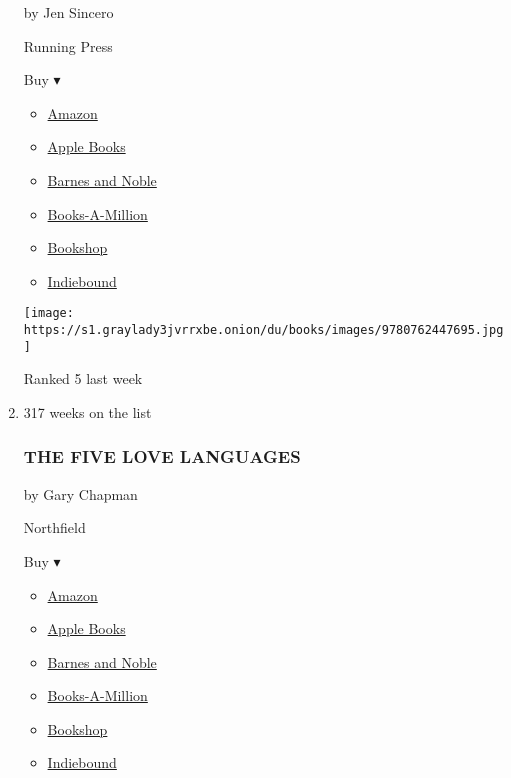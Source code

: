 \begin{enumerate}
  by Jen Sincero

  Running Press

  Buy ▾

  \begin{itemize}
  \tightlist
  \item
    \href{http://www.amazon.com/You-Are-Badass-Doubting-Greatness-ebook/dp/B00B3M3VWS?tag=NYTBS-20}{Amazon}
  \item
    \href{https://du-gae-books-dot-nyt-du-prd.appspot.com/buy?title=YOU+ARE+A+BADASS\&author=Jen+Sincero}{Apple
    Books}
  \item
    \href{https://www.anrdoezrs.net/click-7990613-11819508?url=https\%3A\%2F\%2Fwww.barnesandnoble.com\%2Fw\%2F\%3Fean\%3D9780762447695}{Barnes
    and Noble}
  \item
    \href{https://www.anrdoezrs.net/click-7990613-35140?url=https\%3A\%2F\%2Fwww.booksamillion.com\%2Fp\%2FYOU\%2BARE\%2BA\%2BBADASS\%2FJen\%2BSincero\%2F9780762447695}{Books-A-Million}
  \item
    \href{https://bookshop.org/a/3546/9780762447695}{Bookshop}
  \item
    \href{https://www.indiebound.org/book/9780762447695?aff=NYT}{Indiebound}
  \end{itemize}

  \texttt{[image: https://s1.graylady3jvrrxbe.onion/du/books/images/9780762447695.jpg]}

  Ranked 5 last week
\item
  317 weeks on the list

  \hypertarget{the-five-love-languages}{%
  \subsubsection{THE FIVE LOVE
  LANGUAGES}\label{the-five-love-languages}}

  by Gary Chapman

  Northfield

  Buy ▾

  \begin{itemize}
  \tightlist
  \item
    \href{http://www.amazon.com/The-Love-Languages-Secret-Lasts/dp/0802473156?tag=NYTBS-20}{Amazon}
  \item
    \href{https://du-gae-books-dot-nyt-du-prd.appspot.com/buy?title=THE+FIVE+LOVE+LANGUAGES\&author=Gary+Chapman}{Apple
    Books}
  \item
    \href{https://www.anrdoezrs.net/click-7990613-11819508?url=https\%3A\%2F\%2Fwww.barnesandnoble.com\%2Fw\%2F\%3Fean\%3D9780802412706}{Barnes
    and Noble}
  \item
    \href{https://www.anrdoezrs.net/click-7990613-35140?url=https\%3A\%2F\%2Fwww.booksamillion.com\%2Fp\%2FTHE\%2BFIVE\%2BLOVE\%2BLANGUAGES\%2FGary\%2BChapman\%2F9780802412706}{Books-A-Million}
  \item
    \href{https://bookshop.org/a/3546/9780802412706}{Bookshop}
  \item
    \href{https://www.indiebound.org/book/9780802412706?aff=NYT}{Indiebound}
  \end{itemize}


\end{enumerate}
